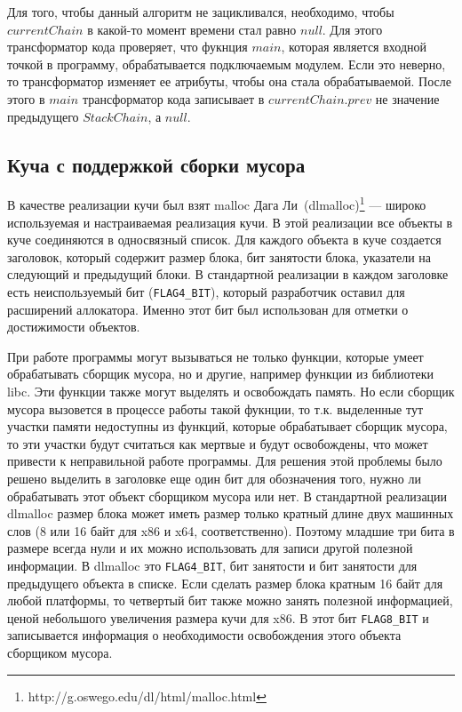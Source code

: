 \documentclass[14pt]{extarticle}
\begin{document}
Для того, чтобы данный алгоритм не зацикливался, необходимо, чтобы $currentChain$ в какой-то момент времени стал равно $null$.
Для этого трансформатор кода проверяет, что фукнция $main$, которая является входной точкой в программу, обрабатывается подключаемым модулем. Если это неверно, то трансформатор изменяет ее атрибуты, чтобы она стала обрабатываемой. После этого в $main$ трансформатор кода записывает в $currentChain.prev$ не значение предыдущего $StackChain$, а $null$.   

\subsection{Куча с поддержкой сборки мусора}
В качестве реализации кучи был взят malloc Дага Ли~(dlmalloc)\footnote{http://g.oswego.edu/dl/html/malloc.html} --- широко используемая и настраиваемая реализация кучи. В этой реализации все объекты в куче соединяются в односвязный список. Для каждого объекта в куче создается заголовок, который содержит размер блока, бит занятости блока, указатели на следующий и предыдущий блоки. В стандартной реализации в каждом заголовке есть неиспользуемый бит (\texttt{FLAG4\_BIT}), который разработчик оставил для расширений аллокатора. Именно этот бит был использован для отметки о достижимости объектов. 

При работе программы могут вызываться не только функции, которые умеет обрабатывать сборщик мусора, но и другие, например функции из библиотеки libc. Эти функции также могут выделять и освобождать память. Но если сборщик мусора вызовется в процессе работы такой фукнции, то т.к. выделенные тут участки памяти недоступны из функций, которые обрабатывает сборщик мусора, то эти участки будут считаться как мертвые и будут освобождены, что может привести к неправильной работе программы. Для решения этой проблемы было решено выделить в заголовке еще один бит для обозначения того, нужно ли обрабатывать этот объект сборщиком мусора или нет. В стандартной реализации dlmalloc размер блока может иметь размер только кратный длине двух машинных слов (8 или 16 байт для x86 и x64, соответственно). Поэтому младшие три бита в размере всегда нули и их можно использовать для записи другой полезной информации. В dlmalloc это \texttt{FLAG4\_BIT}, бит занятости и бит занятости для предыдущего объекта в списке. Если сделать размер блока кратным 16 байт для любой платформы, то четвертый бит также можно занять полезной информацией, ценой небольшого увеличения размера кучи для x86. В этот бит \texttt{FLAG8\_BIT} и записывается информация о необходимости освобождения этого объекта сборщиком мусора.
\end{document}
